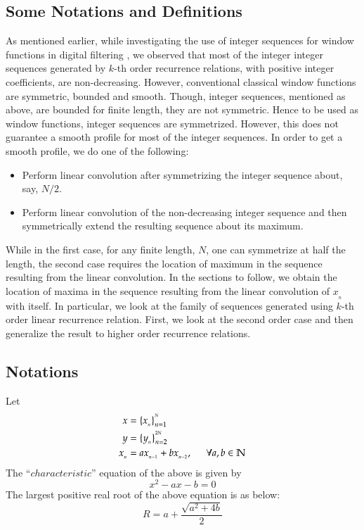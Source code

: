 \begin{multicols}{2}
\section{Some Notations and Definitions}\label{section-15}
As mentioned earlier, while investigating the use of integer sequences for window functions in digital filtering \cite{arul}, we observed that most of the integer integer sequences generated by $k$-th order recurrence relations, with positive integer coefficients, are non-decreasing. However, conventional classical window functions are symmetric, bounded and smooth. Though, integer sequences, mentioned as above, are bounded for finite length, they are not symmetric. Hence to be used as window functions, integer sequences are symmetrized. However, this does not guarantee a smooth profile for most of the integer sequences. In order to get a smooth profile, we do one of the following:
\begin{itemize}
\item Perform linear convolution after symmetrizing the integer sequence about, say, $N/2$.
\item Perform linear convolution of the non-decreasing integer sequence and then symmetrically extend the resulting sequence about its maximum.
\end{itemize}
While in the first case, for any finite length, $N$, one can symmetrize at half the length, the second case requires the location of maximum in the sequence resulting from the linear convolution. In the sections to follow, we obtain the location of maxima in the sequence resulting from the linear convolution of $x_{_n}$ with itself. In particular, we look at the family of sequences generated using $k$-th order linear recurrence relation. First, we look at the second order case and then generalize the result to higher order recurrence relations.

\subsection{Notations}\label{subsection-15.1}
Let
\begin{align}
 x &= \{ x_{_n} \}_{n=1}^{^{N}}\label{eq-15.1}\\
 y &= \{y_{_n}\}_{n=2}^{^{2N}} \label{eq-15.2}\\
 x_{_n} &= ax_{_{n-1}} + bx_{_{n-2}}, \hspace{0.2in} \forall a,b \in \mathbb N \label{eq-15.3}
\end{align}
The ``$characteristic$'' equation of the above is given by
\begin{equation}
x^2 - ax - b = 0\label{eq-15.4}
\end{equation}
The largest positive real root of the above equation is as below:
\begin{equation}
R = a + \displaystyle{\frac{\sqrt{a^2+4b}}{2}}\label{eq-15.5}
\end{equation}
 

\end{multicols}
